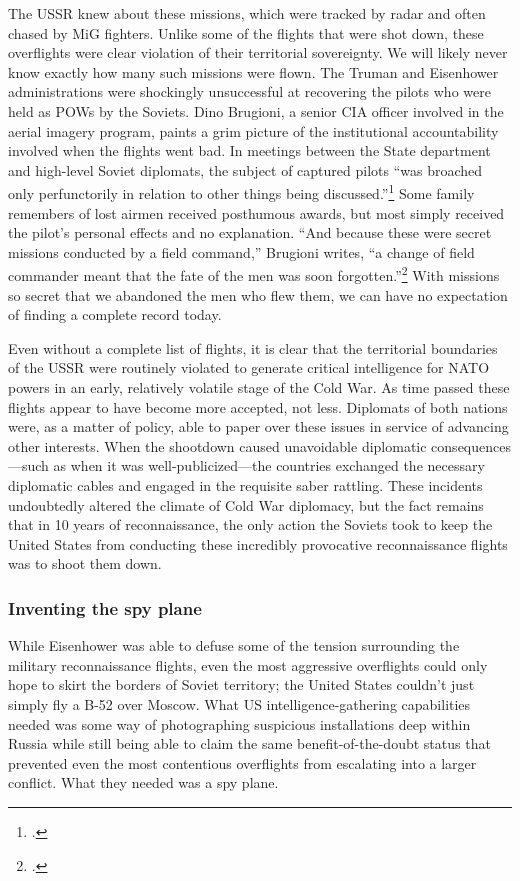 \documentclass[14pt]{extarticle}
\begin{document}
The USSR knew about these missions, which were tracked by radar and often chased by MiG fighters. Unlike some of the flights that were shot down, these overflights were clear violation of their territorial sovereignty. We will likely never know exactly how many such missions were flown. The Truman and Eisenhower administrations were shockingly unsuccessful at recovering the pilots who were held as POWs by the Soviets. Dino Brugioni, a senior CIA officer involved in the aerial imagery program, paints a grim picture of the institutional accountability involved when the flights went bad. In meetings between the State department and high-level Soviet diplomats, the subject of captured pilots \enquote{was broached only perfunctorily in relation to other things being discussed.}\footcite[p.~72]{brugioni_eyes_2010} Some family remembers of lost airmen received posthumous awards, but most simply received the pilot's personal effects and no explanation. \enquote{And because these were secret missions conducted by a field command,} Brugioni writes, \enquote{a change of field commander meant that the fate of the men was soon forgotten.}\footcite[p.~72]{brugioni_eyes_2010} With missions so secret that we abandoned the men who flew them, we can have no expectation of finding a complete record today.

Even without a complete list of flights, it is clear that the territorial boundaries of the USSR were routinely violated to generate critical intelligence for NATO powers in an early, relatively volatile stage of the Cold War. As time passed these flights appear to have become more accepted, not less. Diplomats of both nations were, as a matter of policy, able to paper over these issues in service of advancing other interests. When the shootdown caused unavoidable diplomatic consequences---such as when it was well-publicized---the countries exchanged the necessary diplomatic cables and engaged in the requisite saber rattling. These incidents undoubtedly altered the climate of Cold War diplomacy, but the fact remains that in 10 years of reconnaissance, the only action the Soviets took to keep the United States from conducting these incredibly provocative reconnaissance flights was to shoot them down.

\subsubsection{Inventing the spy plane}
While Eisenhower was able to defuse some of the tension surrounding the military reconnaissance flights, even the most aggressive overflights could only hope to skirt the borders of Soviet territory; the United States couldn't just simply fly a B-52 over Moscow. What US intelligence-gathering capabilities needed was some way of photographing suspicious installations deep within Russia while still being able to claim the same benefit-of-the-doubt status that prevented even the most contentious overflights from escalating into a larger conflict. What they needed was a spy plane.
\end{document}
